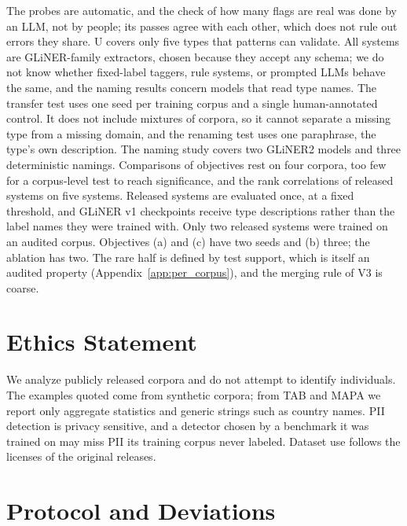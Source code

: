 \documentclass[11pt]{article}
\begin{document}
The probes are automatic, and the check of how many flags are real
was done by an LLM, not by people; its passes agree with each other,
which does not rule out errors they share. U covers only five types that
patterns can validate. All systems are GLiNER-family extractors, chosen
because they accept any schema; we do not know whether fixed-label
taggers, rule systems, or prompted LLMs behave the same, and the naming
results concern models that read type names. The transfer test uses
one seed per training corpus and a single human-annotated control. It
does not include mixtures of corpora, so it cannot separate a missing
type from a missing domain, and the renaming test uses one paraphrase,
the type's own description. The naming study covers two GLiNER2 models
and three deterministic namings.
Comparisons of objectives rest on four corpora, too few for a
corpus-level test to reach significance, and the rank correlations of
released systems on five systems. Released systems are evaluated once, at a
fixed threshold, and GLiNER v1
checkpoints receive type descriptions rather than the label names they
were trained with. Only two released systems were trained on an audited
corpus. Objectives (a) and (c) have two seeds and (b)
three; the ablation has two. The rare half is defined by test support, which is itself
an audited property (Appendix~\ref{app:per_corpus}), and the merging rule
of V3 is coarse.

\section*{Ethics Statement}

We analyze publicly released corpora and do not attempt to identify
individuals. The examples quoted come from synthetic corpora; from TAB
and MAPA we report only aggregate statistics and generic strings such as
country names. PII detection is privacy sensitive, and a detector chosen
by a benchmark it was trained on may miss PII its training corpus never
labeled. Dataset use follows the licenses of the original releases.




\appendix

\FloatBarrier
\section{Protocol and Deviations}
\label{app:protocol}
\end{document}
